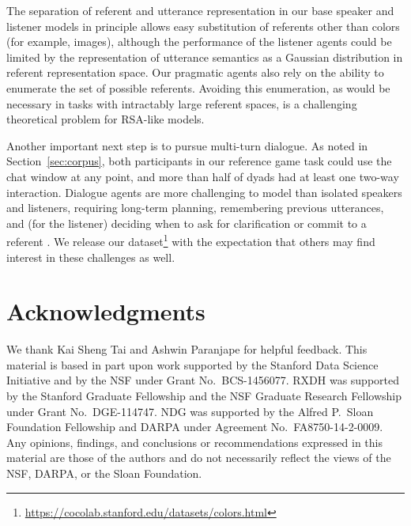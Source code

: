 \documentclass[11pt,letterpaper]{article}
\renewcommand{\|}{\mid}
\newcommand{\secref}[1]{Section~\ref{#1}}
\begin{document}
The separation of referent and utterance representation in our base speaker and
listener models in principle allows easy substitution of referents other than colors
(for example, images), although the performance of the listener agents could be
limited by the representation of utterance semantics as a Gaussian distribution in
referent representation space. Our pragmatic agents also rely on the ability to 
enumerate the set of possible referents. Avoiding this enumeration, as would be 
necessary in tasks with intractably large referent spaces, is a challenging 
theoretical problem for RSA-like models.

Another important next step is to pursue
multi-turn dialogue. As noted in \secref{sec:corpus},
both participants in our reference game task could use the chat window
at any point, and more than half of dyads
had at least one two-way interaction. Dialogue agents are more
challenging to model than isolated speakers and listeners,
requiring long-term planning, remembering previous utterances, and
(for the listener) deciding when to ask for clarification or commit to a referent
\cite{Lewis79_Scorekeeping,BrownYule83_Discourse,Clark96,Roberts96_InformationStructureDiscourse}.
We release our
dataset\footnote{\label{foot:release}\url{https://cocolab.stanford.edu/datasets/colors.html}}
with the expectation that others may find interest in these challenges as well.


\section*{Acknowledgments}

We thank Kai Sheng Tai and Ashwin Paranjape for helpful feedback.
This material is based in part upon work supported by the 
Stanford Data Science Initiative and by the NSF
under Grant No.\ BCS-1456077.
RXDH was supported by the Stanford Graduate Fellowship and the
NSF Graduate Research Fellowship under Grant No.\ DGE-114747.
NDG was supported by the Alfred P.\ Sloan Foundation Fellowship and
DARPA under Agreement No.\ FA8750-14-2-0009.
Any opinions, findings, and conclusions or recommendations 
expressed in this material are those of the authors and do not necessarily
reflect the views of the NSF, DARPA, or the Sloan Foundation.
\end{document}
